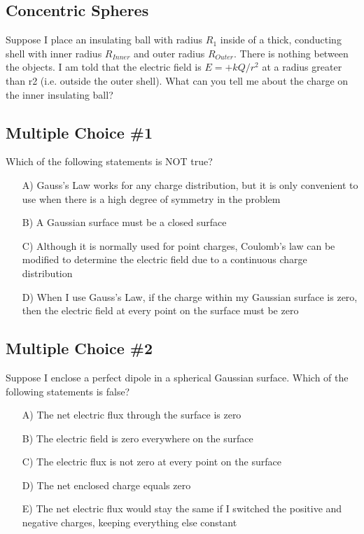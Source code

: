 \documentclass[11pt]{article}
\begin{document}
\subsection{Concentric Spheres}
Suppose I place an insulating ball with radius $R_1$ inside of a thick, conducting shell with inner radius $R_{Inner}$ and outer radius $R_{Outer}$.  There is nothing between the objects.  I am told that the electric field is $E = +kQ/r^2$ at a radius greater than r2 (i.e. outside the outer shell).  What can you tell me about the charge on the inner insulating ball?

\subsection{Multiple Choice \#1}
Which of the following statements is NOT true?

\begin{itemize}
 \item[A)] Gauss's Law works for any charge distribution, but it is only convenient to use when there is a high degree of symmetry in the problem
 \item[B)] A Gaussian surface must be a closed surface
 \item[C)] Although it is normally used for point charges, Coulomb's law can be modified to determine the electric field due to a continuous charge distribution
 \item[D)] When I use Gauss's Law, if the charge within my Gaussian surface is zero, then the electric field at every point on the surface must be zero
\end{itemize}

\subsection{Multiple Choice \#2}
Suppose I enclose a perfect dipole in a spherical Gaussian surface.  Which of the following statements is false?

\begin{itemize}
\item[A)] The net electric flux through the surface is zero
\item[B)] The electric field is zero everywhere on the surface
\item[C)] The electric flux is not zero at every point on the surface
\item[D)] The net enclosed charge equals zero
\item[E)] The net electric flux would stay the same if I switched the positive and negative charges, keeping everything else constant
\end{itemize}
\end{document}
